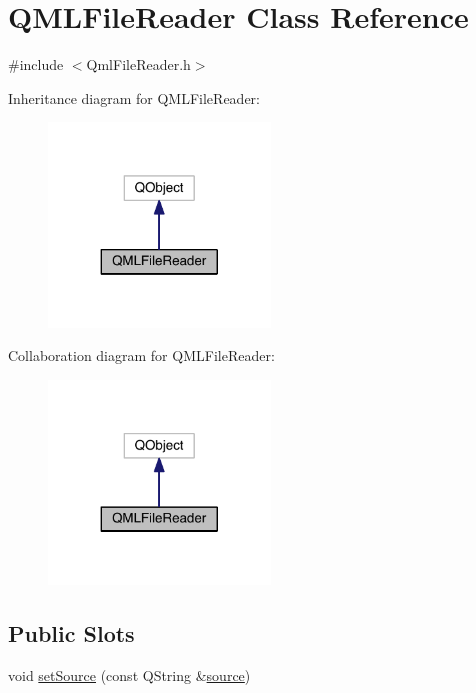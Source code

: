 \hypertarget{class_q_m_l_file_reader}{\section{Q\+M\+L\+File\+Reader Class Reference}
\label{class_q_m_l_file_reader}
}


{\ttfamily \#include $<$Qml\+File\+Reader.\+h$>$}



Inheritance diagram for Q\+M\+L\+File\+Reader\+:\nopagebreak
\begin{figure}[H]
\begin{center}
\leavevmode
\includegraphics[width=167pt]{class_q_m_l_file_reader__inherit__graph}
\end{center}
\end{figure}


Collaboration diagram for Q\+M\+L\+File\+Reader\+:\nopagebreak
\begin{figure}[H]
\begin{center}
\leavevmode
\includegraphics[width=167pt]{class_q_m_l_file_reader__coll__graph}
\end{center}
\end{figure}
\subsection*{Public Slots}
\begin{DoxyCompactItemize}
\item 
void \hyperlink{class_q_m_l_file_reader_a37c57f9669cbece5191fe83e67d400cf}{set\+Source} (const Q\+String \&\hyperlink{class_q_m_l_file_reader_aa4d8a2f6a537545a12aebb8e5ce72318}{source})
\end{DoxyCompactItemize}
